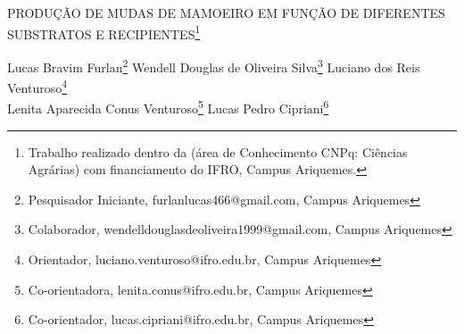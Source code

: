 \documentclass[article,12pt,onesidea,4paper,english,brazil]{abntex2}
\begin{document}
	
	
	\frenchspacing 
	
	\begin{center}
		\LARGE PRODUÇÃO DE MUDAS DE MAMOEIRO EM FUNÇÃO DE DIFERENTES SUBSTRATOS E RECIPIENTES\footnote{Trabalho realizado dentro da (área de Conhecimento CNPq: Ciências Agrárias) com financiamento
			do IFRO, Campus Ariquemes.}
		
		\normalsize
		Lucas Bravim Furlan\footnote{Pesquisador Iniciante, furlanlucas466@gmail.com, Campus Ariquemes} 
		Wendell Douglas de Oliveira Silva\footnote{Colaborador, wendelldouglasdeoliveira1999@gmail.com, Campus Ariquemes} 
		Luciano dos Reis Venturoso\footnote{Orientador, luciano.venturoso@ifro.edu.br, Campus Ariquemes} \\
		Lenita Aparecida Conus Venturoso\footnote{Co-orientadora, lenita.conus@ifro.edu.br, Campus Ariquemes} 
		Lucas Pedro Cipriani\footnote{Co-orientador, lucas.cipriani@ifro.edu.br, Campus Ariquemes}
	\end{center}
	
\end{document}
